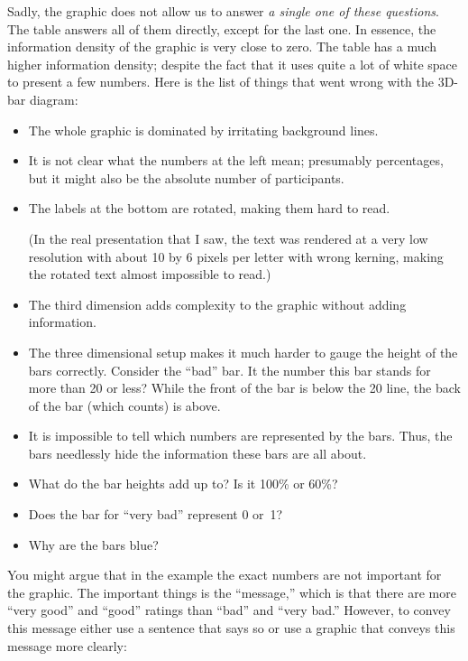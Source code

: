 Sadly, the graphic does not allow us to answer \emph{a single one of these
questions}. The table answers all of them directly, except for the last one. In
essence, the information density of the graphic is very close to zero. The
table has a much higher information density; despite the fact that it uses
quite a lot of white space to present a few numbers. Here is the list of things
that went wrong with the 3D-bar diagram:
%
\begin{itemize}
    \item The whole graphic is dominated by irritating background lines.
    \item It is not clear what the numbers at the left mean; presumably
        percentages, but it might also be the absolute number of
        participants.
    \item The labels at the bottom are rotated, making them hard to read.

        (In the real presentation that I saw, the text was rendered at a very
        low resolution with about 10 by 6 pixels per letter with wrong
        kerning, making the rotated text almost impossible to read.)
    \item The third dimension adds complexity to the graphic without adding
        information.
    \item The three dimensional setup makes it much harder to gauge the
        height of the bars correctly. Consider the ``bad'' bar. It the number
        this bar stands for more than 20 or less? While the front of the bar
        is below the 20 line, the back of the bar (which counts) is above.
    \item It is impossible to tell which  numbers are represented by the
        bars. Thus, the bars needlessly hide the information these bars are
        all about.
    \item What do the bar heights add up to? Is it 100\% or 60\%?
    \item Does the bar for ``very bad'' represent 0 or~1?
    \item Why are the bars blue?
\end{itemize}

You might argue that in the example the exact numbers are not important for the
graphic. The important things is the ``message,'' which is that there are more
``very good'' and ``good'' ratings than ``bad'' and ``very bad.'' However, to
convey this message either use a sentence that says so or use a graphic that
conveys this message more clearly:

